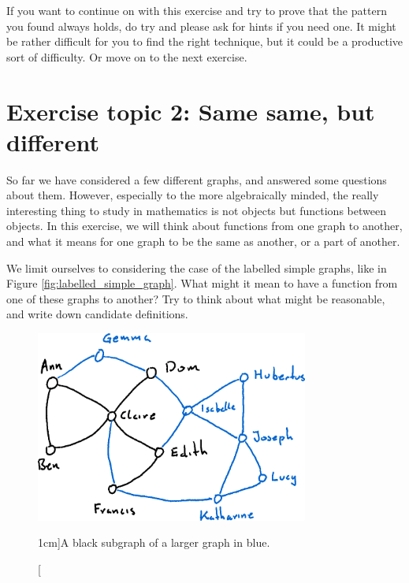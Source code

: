 \documentclass[nobib]{tufte-handout}
\begin{document}
If you want to continue on with this exercise and try to prove that the pattern you found always holds, do try and please ask for hints if you need one. It might be rather difficult for you to find the right technique, but it could be a productive sort of difficulty. Or move on to the next exercise.

\section{Exercise topic 2: Same same, but different}

So far we have considered a few different graphs, and answered some questions about them. However, especially to the more algebraically minded, the really interesting thing to study in mathematics is not objects but functions between objects. In this exercise, we will think about functions from one graph to another, and what it means for one graph to be the same as another, or a part of another.

\begin{xca}
  We limit ourselves to considering the case of the labelled simple graphs, like in Figure \ref{fig:labelled_simple_graph}. What might it mean to have a function from one of these graphs to another? Try to think about what might be reasonable, and write down candidate definitions.
\end{xca}

\begin{figure}
  \centering
  \includegraphics[width=0.8\textwidth]{graphics/L1_exc/subgraph.png}
  \caption[][1cm]{A black subgraph of a larger graph in blue.}
  \label{fig:subgraph}
\end{figure}
\end{document}
